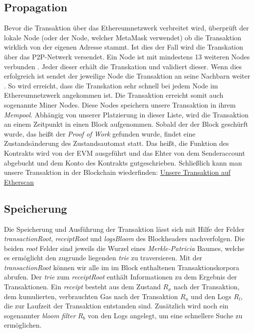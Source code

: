 \documentclass[runningheads]{llncs}
\begin{document}
\subsection{Propagation}
Bevor die Transaktion über das Ethereumnetzwerk verbreitet wird, überprüft der lokale Node (oder der Node, welcher MetaMask verwendet) ob die Transaktion wirklich von der eigenen Adresse stammt. Ist dies der Fall wird die Transkation über das P2P-Netwerk versendet. Ein Node ist mit mindestens 13 weiteren Nodes verbunden \cite[S. 123]{antonopoulos_mastering_2019}. Jeder dieser erhält die Transkation und validiert dieser. Wenn dies erfolgreich ist sendet der jeweilige Node die Transaktion an seine Nachbarn weiter \cite[S. 123]{antonopoulos_mastering_2019}. So wird erreicht, dass die Transkation sehr schnell bei jedem Node im Ethereumnetzwerk angekommen ist. Die Transaktion erreicht somit auch sogenannte Miner Nodes. Diese Nodes speichern unsere Transaktion in ihrem \textit{Mempool}. Abhängig von unserer Platzierung in dieser Liste, wird die Transaktion an einem Zeitpunkt in einen Block aufgenommen. Sobald der der Block geschürft wurde, das heißt der \textit{Proof of Work} gefunden wurde, findet eine Zustandsänderung des Zustandsautomat statt. Das heißt, die Funktion des Kontrakts wird von der EVM ausgeführt und das Ehter von dem Senderaccount abgebucht und dem Konto des Kontrakts gutgeschrieben. Schließlich kann man unsere Transaktion in der Blockchain wiederfinden: \href{https://ropsten.etherscan.io/tx/0x6c5cd70f3464a6b68f95ba1bb7ebb5ece5a2f1ab4d45a5bb068e727e08fa827d}{Unsere Transaktion auf Etherscan}
\subsection{Speicherung}
Die Speicherung und Ausführung der Transaktion lässt sich mit Hilfe der Felder \textit{transactionRoot}, \textit{receiptRoot} und \textit{logsBloom} des Blockheaders nachverfolgen. Die beiden \textit{root} Felder sind jeweils die Wurzel eines \textit{Merkle-Patricia} Baumes, welche es ermöglicht den zugrunde liegenden \textit{trie} zu traversieren. \cite{noauthor_ethereum/patricia_nodate} Mit der \textit{transactionRoot} können wir alle  im im Block enthaltenen Transaktionskorpora abrufen. Der \textit{trie} zum \textit{receiptRoot} enthält Informationen zu dem Ergebnis der Transaktionen. Ein \textit{receipt} besteht aus dem Zustand $ R_{\sigma} $ nach der Transaktion, dem kumulierten, verbrauchten Gas nach der Transaktion $ R_u $ und den Logs $ R_l $, die zur Laufzeit der Transaktion entstanden sind. Zusätzlich wird noch ein sogenannter \textit{bloom filter} $ R_b $ von den Logs angelegt, um eine schnellere Suche zu ermöglichen. \cite{noauthor_logs_nodate}
\end{document}
